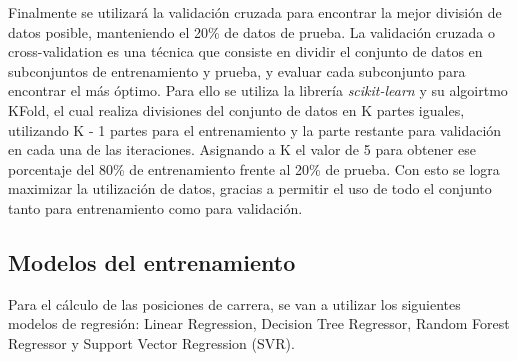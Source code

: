 Finalmente se utilizará la validación cruzada para encontrar la mejor división de datos posible, manteniendo el 20\% de datos de prueba. La validación cruzada o cross-validation es una técnica que consiste en dividir el conjunto de datos en subconjuntos de entrenamiento y prueba, y evaluar cada subconjunto para encontrar el más óptimo. Para ello se utiliza la librería \textit{scikit-learn} y su algoirtmo KFold, el cual realiza divisiones del conjunto de datos en K partes iguales, utilizando K - 1 partes para el entrenamiento y la parte restante para validación en cada  una de las iteraciones. Asignando a K el valor de 5 para obtener ese porcentaje del 80\% de entrenamiento frente al 20\% de prueba. Con esto se logra maximizar la utilización de datos, gracias a permitir el uso de todo el conjunto tanto para entrenamiento como para validación.

\subsection{Modelos del entrenamiento}
Para el cálculo de las posiciones de carrera, se van a utilizar los siguientes modelos de regresión: Linear Regression, Decision Tree Regressor, Random Forest Regressor y Support Vector Regression (SVR).


